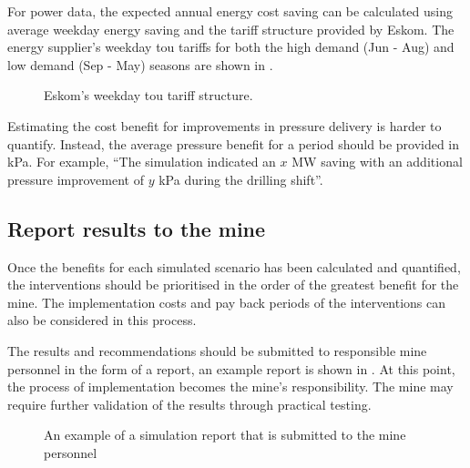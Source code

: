		For power data, the expected annual energy cost saving can be calculated using average weekday energy saving and the tariff structure provided by Eskom. The energy supplier's weekday \gls{tou} tariffs for both the high demand (Jun - Aug) and low demand (Sep - May) seasons are shown in .
		\par 
		\begin{figure}[h]
			\centering
			
			\caption[Eskom's weekday TOU tariff structure]{Eskom's weekday \gls{tou} tariff structure.\protect \footnotemark[1]}
			\label{fig: Tariff}
		\end{figure}
		
		Estimating the cost benefit for improvements in pressure delivery is harder to quantify. Instead, the average pressure benefit for a period should be provided in kPa. For example, \enquote{The simulation indicated an $x$ MW saving with an additional pressure improvement of $y$ kPa during the drilling shift}.

		\subsection{Report results to the mine}
		Once the benefits for each simulated scenario has been calculated and quantified, the interventions should be prioritised in the order of the greatest benefit for the mine. The implementation costs and pay back periods of the interventions can also be considered in this process.
		\par
		The results and recommendations should be submitted to responsible mine personnel in the form of a report, an example report is shown in . At this point, the process of implementation becomes the mine's responsibility. The mine may require further validation of the results through practical testing.
		\begin{figure}[h]
			\centering
			\caption{An example of a simulation report that is submitted to the mine personnel}
			\label{fig: Report example}
		\end{figure}

